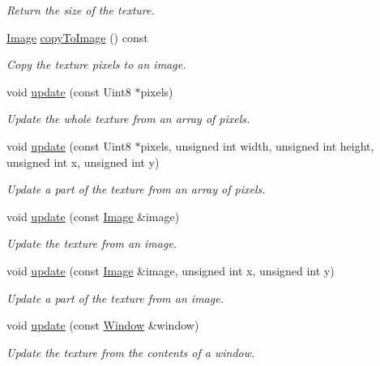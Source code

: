 \begin{DoxyCompactItemize}
\begin{DoxyCompactList}\small\item\em Return the size of the texture. \end{DoxyCompactList}\item 
\hyperlink{classsf_1_1Image}{Image} \hyperlink{classsf_1_1Texture_aefc19bcd95565dd2348fd4cec0facddc}{copy\-To\-Image} () const 
\begin{DoxyCompactList}\small\item\em Copy the texture pixels to an image. \end{DoxyCompactList}\item 
void \hyperlink{classsf_1_1Texture_ae4eab5c6781316840b0c50ad08370963}{update} (const Uint8 $\ast$pixels)
\begin{DoxyCompactList}\small\item\em Update the whole texture from an array of pixels. \end{DoxyCompactList}\item 
void \hyperlink{classsf_1_1Texture_a1352d8e16c2aeb4df586ed65dd2c36b9}{update} (const Uint8 $\ast$pixels, unsigned int width, unsigned int height, unsigned int x, unsigned int y)
\begin{DoxyCompactList}\small\item\em Update a part of the texture from an array of pixels. \end{DoxyCompactList}\item 
void \hyperlink{classsf_1_1Texture_a037cdf171af0fb392d07626a44a4ea17}{update} (const \hyperlink{classsf_1_1Image}{Image} \&image)
\begin{DoxyCompactList}\small\item\em Update the texture from an image. \end{DoxyCompactList}\item 
void \hyperlink{classsf_1_1Texture_a87f916490b757fe900798eedf3abf3ba}{update} (const \hyperlink{classsf_1_1Image}{Image} \&image, unsigned int x, unsigned int y)
\begin{DoxyCompactList}\small\item\em Update a part of the texture from an image. \end{DoxyCompactList}\item 
void \hyperlink{classsf_1_1Texture_ad3cceef238f7d5d2108a98dd38c17fc5}{update} (const \hyperlink{classsf_1_1Window}{Window} \&window)
\begin{DoxyCompactList}\small\item\em Update the texture from the contents of a window. \end{DoxyCompactList}\item 

\end{DoxyCompactItemize}
